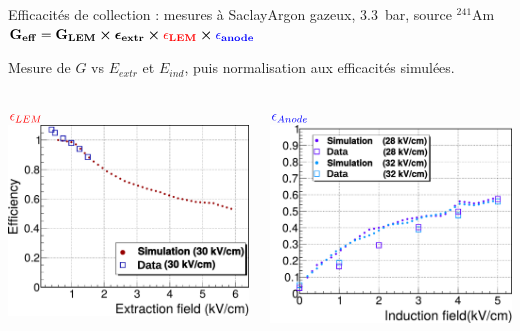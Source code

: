     \begin{frame}{Efficacités de collection : mesures à Saclay}{Argon gazeux, \SI{3.3}{\bar}, source $^{241}$Am}
        $\mathbf{G_{eff}=G_{LEM}\boldsymbol{\times}\boldsymbol{\epsilon}_{extr} \boldsymbol{\times}\textcolor{red}{\epsilon_{LEM}}\boldsymbol{\times} \textcolor{blue}{\epsilon_{anode}}}$\\\vspace{0.2cm}
        
        \begin{scriptsize}
         Mesure de $G$ vs $E_{extr}$ et $E_{ind}$, puis normalisation aux efficacités simulées.\\\vfill
        \begin{columns}
            \begin{column}{0.5\textwidth}
                \centering $\textcolor{red}{\epsilon_{LEM}}$
                \includegraphics[width=\textwidth]{./pictures/eff_lem_gamelle.pdf}
            \end{column}\hfill
            \begin{column}{0.5\textwidth}
                \centering $\textcolor{blue}{\epsilon_{Anode}}$
                \includegraphics[width=\textwidth]{./pictures/eff_anode_gamelle.pdf}

\end{column}
\end{columns}
\end{scriptsize}
\end{frame}
